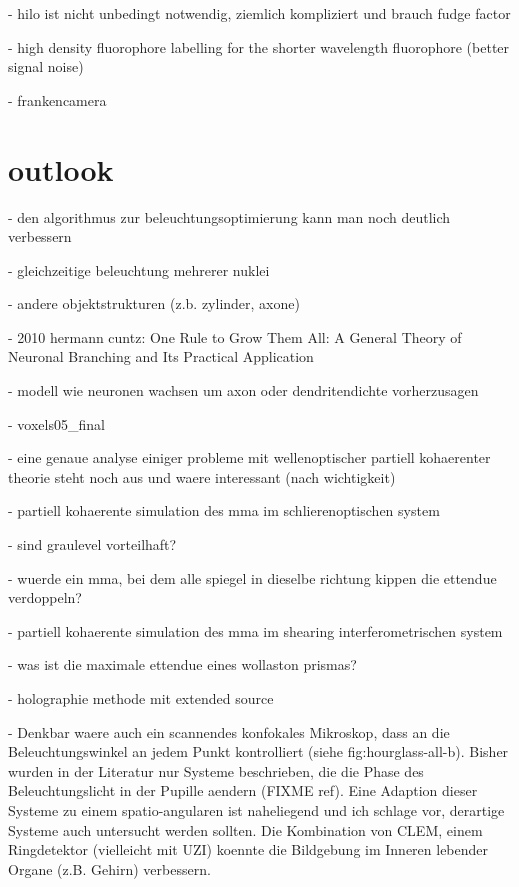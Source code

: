\documentclass[oneside,a4paper,12pt,BCOR20mm,DIV14]{scrbook} %
\begin{document}
- hilo ist nicht unbedingt notwendig, ziemlich kompliziert und brauch
  fudge factor

  - high density fluorophore labelling for the shorter wavelength
  fluorophore (better signal noise)

- frankencamera
\chapter{outlook}
\label{sec:outlook}
- den algorithmus zur beleuchtungsoptimierung kann man noch deutlich
  verbessern

  - gleichzeitige beleuchtung mehrerer nuklei

  - andere objektstrukturen (z.b. zylinder, axone)

    - 2010 hermann cuntz: One Rule to Grow Them All: A General Theory
      of Neuronal Branching and Its Practical Application

      - modell wie neuronen wachsen um axon oder dendritendichte
        vorherzusagen

  - voxels05\_final

- eine genaue analyse einiger probleme mit wellenoptischer partiell
  kohaerenter theorie steht noch aus und waere interessant (nach
  wichtigkeit)

  - partiell kohaerente simulation des mma im schlierenoptischen system

    - sind graulevel vorteilhaft?

    - wuerde ein mma, bei dem alle spiegel in dieselbe richtung kippen
      die ettendue verdoppeln?

  - partiell kohaerente simulation des mma im shearing
    interferometrischen system

    - was ist die maximale ettendue eines wollaston prismas?

  - holographie methode mit extended source

  - Denkbar waere auch ein scannendes konfokales Mikroskop, dass an
    die Beleuchtungswinkel an jedem Punkt kontrolliert (siehe
    fig:hourglass-all-b).  Bisher wurden in der Literatur nur Systeme
    beschrieben, die die Phase des Beleuchtungslicht in der Pupille
    aendern (FIXME ref). Eine Adaption dieser Systeme zu einem
    spatio-angularen ist naheliegend und ich schlage vor, derartige
    Systeme auch untersucht werden sollten. Die Kombination von CLEM,
    einem Ringdetektor (vielleicht mit UZI) koennte die Bildgebung im
    Inneren lebender Organe (z.B. Gehirn) verbessern.

\appendix



%
\end{document}
